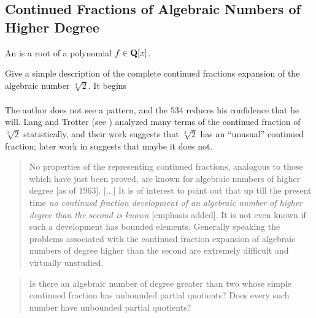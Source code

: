 \subsection{Continued Fractions of Algebraic Numbers of Higher Degree}\label{sec:cf_deg}
\begin{definition}
An  is a root of a polynomial $f\in\mathbf{Q}[x]$.
\end{definition}
\begin{openproblem}
Give a simple description of
the complete continued fractions
expansion of the algebraic number $\sqrt[3]{2}$.
It begins
\begin{align*}
[&1, 3, 1, 5, 1, 1, 4, 1, 1, 8, 1, 14, 1, 10, 2, 1, 4, 12, 2, 3,
 2, 1, 3, 4, 1, 1, 2, 14, \\
&3, 12, 1, 15, 3, 1, 4, 534, 1, 1, 5, 1, 1, \ldots]
\end{align*}
\end{openproblem}
The author does not see a pattern, and the $534$ reduces his
confidence that he will.  Lang and Trotter
(see \cite{langtrotter1}) analyzed many terms of the continued
fraction of $\sqrt[3]{2}$ statistically, and their work suggests that
$\sqrt[3]{2}$ has an ``unusual'' continued fraction; later work in
\cite{langtrotter2} suggests that maybe it does not.

\newpage
{}
\begin{quote}
No properties of the representing continued fractions,
analogous to those which have just been proved, are known
for algebraic numbers of higher degree [as of $1963$].  [...] It is of
interest to point out that up till the present time {\em no
continued fraction development of an algebraic
number of higher degree than the second is known} [emphasis added].
It is not even known if such a development  has bounded
elements.  Generally speaking the problems associated with
the continued fraction expansion of algebraic numbers of degree
higher than the second are extremely difficult and virtually
unstudied.
\end{quote}

\vspace{1ex}
\begin{quote}
  Is there an algebraic number of degree greater than two whose simple
  continued fraction has unbounded partial quotients?  Does every such
  number have unbounded partial quotients?
\end{quote}

